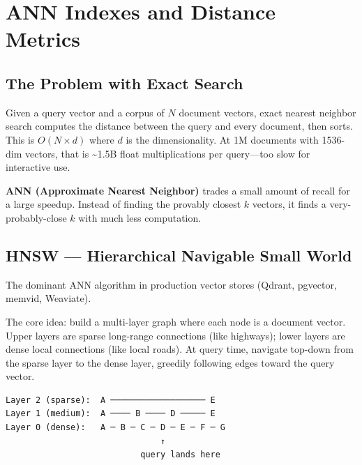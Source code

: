 \chapter{ANN Indexes and Distance Metrics}
\label{ch:ann}

\section{The Problem with Exact Search}

Given a query vector and a corpus of $N$ document vectors, exact nearest neighbor search
computes the distance between the query and every document, then sorts. This is
$O(N \times d)$ where $d$ is the dimensionality. At 1M documents with 1536-dim vectors, that
is \textasciitilde1.5B float multiplications per query---too slow for interactive use.

\textbf{ANN (Approximate Nearest Neighbor)} trades a small amount of recall for a large
speedup. Instead of finding the provably closest $k$ vectors, it finds a very-probably-close
$k$ with much less computation.

\section{HNSW --- Hierarchical Navigable Small World}

The dominant ANN algorithm in production vector stores (Qdrant, pgvector, memvid, Weaviate).

The core idea: build a multi-layer graph where each node is a document vector. Upper layers
are sparse long-range connections (like highways); lower layers are dense local connections
(like local roads). At query time, navigate top-down from the sparse layer to the dense layer,
greedily following edges toward the query vector.

\begin{Verbatim}
Layer 2 (sparse):  A ─────────────────── E
Layer 1 (medium):  A ──── B ──── D ───── E
Layer 0 (dense):   A ─ B ─ C ─ D ─ E ─ F ─ G
                               ↑
                           query lands here
\end{Verbatim}

